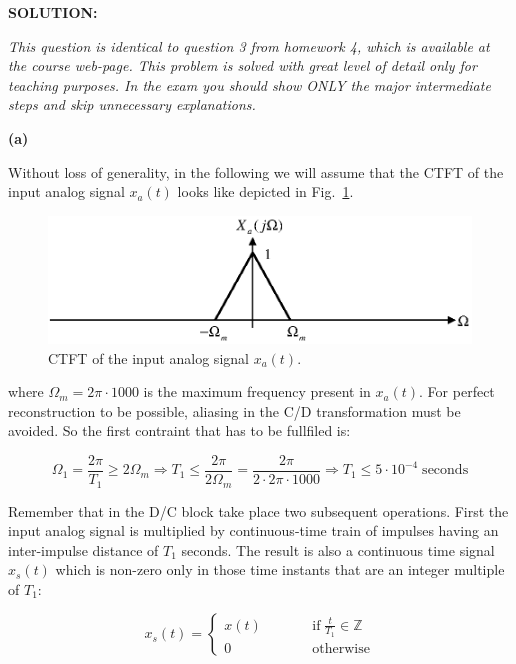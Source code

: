 \documentclass[a4paper,11pt,oneside]{article}
\begin{document}
\vspace{1cm}

\textbf{SOLUTION:}

\emph{This question is identical to question 3 from homework 4, which is available at the course web-page. This problem is solved with great level of detail only for teaching purposes. In the exam you should show ONLY the major intermediate steps and skip unnecessary explanations.}

\textbf{(a)}


Without loss of generality, in the following we will assume that the CTFT of the input analog signal $x_a(t)$ looks like depicted in Fig.~\ref{ctftxa}.

\begin{figure}[h!]
\centering
\includegraphics[width=.8\textwidth]{ctftxa.eps}
\caption{CTFT of the input analog signal $x_a(t)$.}
\label{ctftxa}
\end{figure}


where $\Omega_{m}=2\pi\cdot 1000$ is the maximum frequency present in $x_a(t)$. For perfect reconstruction to be possible, aliasing in the C/D transformation must be avoided. So the first contraint that has to be fullfiled is:

\begin{equation}\label{const1}
\Omega_1=\frac{2\pi}{T_1}\geq 2\Omega_{m} \Rightarrow T_1\leq  \frac{2\pi}{2\Omega_{m}}=\frac{2\pi}{2\cdot 2\pi\cdot 1000}\Rightarrow T_1\leq 5\cdot 10^{-4} \;\textrm{seconds}
\end{equation}

Remember that in the D/C block take place two subsequent operations. First the input analog signal is multiplied by continuous-time train of impulses having an inter-impulse distance of $T_1$ seconds. The result is also a continuous time signal $x_s(t)$ which is non-zero only in those time instants that are an integer multiple of $T_1$:

\[
x_s(t)=\left\{ 
\begin{array}{lll}
x(t) &\qquad & \textrm{if}\; \frac{t}{T_1}\in\mathbb{Z}\\
0 & \qquad & \textrm{otherwise}
\end{array}
\right.
\]
\end{document}
